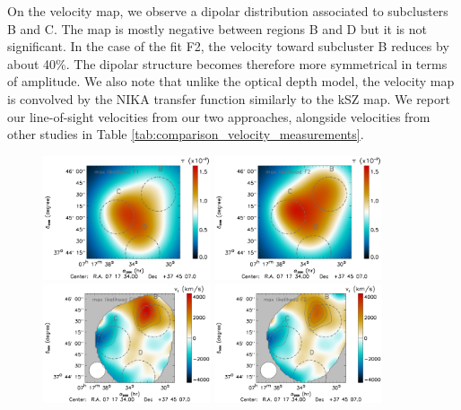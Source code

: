 \documentclass[twocolumn,traditabstract]{aa}
\begin{document}
On the velocity map, we observe a dipolar distribution associated to subclusters B and C. The map is mostly negative between regions B and D but it is not significant. In the case of the fit F2, the velocity toward subcluster B reduces by about 40\%. The dipolar structure becomes therefore more symmetrical in terms of amplitude. We also note that unlike the optical depth model, the velocity map is convolved by the NIKA transfer function similarly to the kSZ map. We report our line-of-sight velocities from our two approaches, alongside velocities from other studies in Table \ref{tab:comparison_velocity_measurements}.
\begin{figure}[h]
\centering
\includegraphics[width=0.44\textwidth]{Figure/MACSJ0717_tau_map_F1.pdf}
\includegraphics[width=0.44\textwidth]{Figure/MACSJ0717_tau_map_F2.pdf}
\includegraphics[width=0.44\textwidth]{Figure/MACSJ0717_vz_map_F1.pdf}
\includegraphics[width=0.44\textwidth]{Figure/MACSJ0717_vz_map_F2.pdf}

\end{figure}
\end{document}
